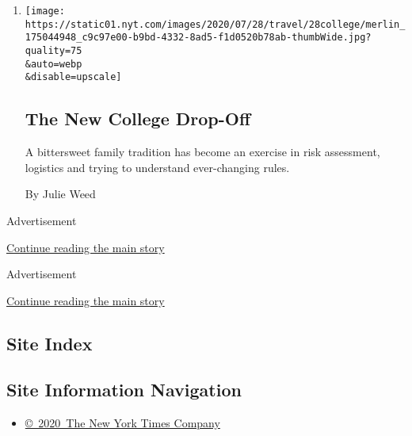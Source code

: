 \begin{enumerate}
\def\labelenumi{\arabic{enumi}.}
\item
  \href{/2020/07/29/travel/virus-college-travel-restrictions.html}{}

  \texttt{[image: https://static01.nyt.com/images/2020/07/28/travel/28college/merlin\_175044948\_c9c97e00-b9bd-4332-8ad5-f1d0520b78ab-thumbWide.jpg?quality=75\\\&auto=webp\\\&disable=upscale]}

  \hypertarget{the-new-college-drop-off}{%
  \subsection{The New College Drop-Off}\label{the-new-college-drop-off}}

  A bittersweet family tradition has become an exercise in risk
  assessment, logistics and trying to understand ever-changing rules.

  By Julie Weed
\end{enumerate}

Advertisement

\protect\hyperlink{after-mid2}{Continue reading the main story}

Advertisement

\protect\hyperlink{after-mktg}{Continue reading the main story}

\hypertarget{site-index}{%
\subsection{Site Index}\label{site-index}}

\hypertarget{site-information-navigation}{%
\subsection{Site Information
Navigation}\label{site-information-navigation}}

\begin{itemize}
\tightlist
\item
  \href{https://help.nytimes.com/hc/en-us/articles/115014792127-Copyright-notice}{©~2020~The
  New York Times Company}
\end{itemize}

